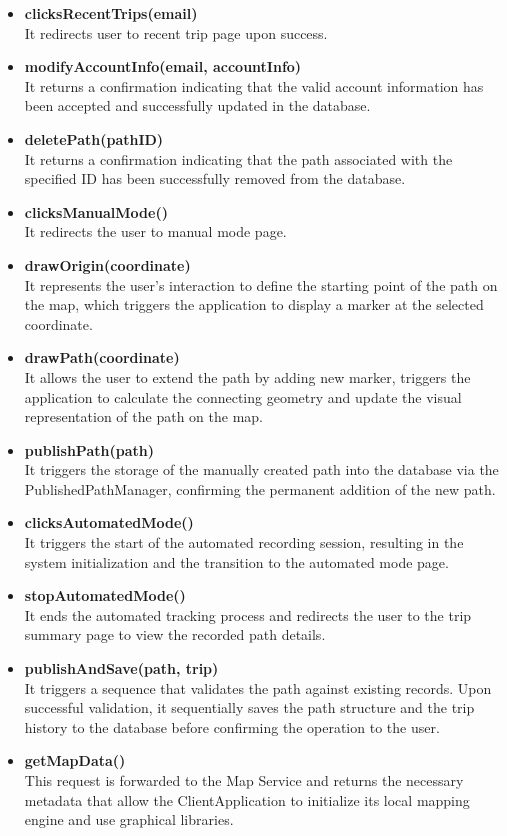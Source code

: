 \begin{itemize}
    It initiates the final save operation for the completed trip and its associated report, ultimately redirecting the user to the home page.
    \item \textbf{clicksRecentTrips(email)}\\
    It redirects user to recent trip page upon success.
    \item \textbf{modifyAccountInfo(email, accountInfo)}\\
    It returns a confirmation indicating that the valid account information has been accepted and successfully updated in the database.
    \item \textbf{deletePath(pathID)}\\
    It returns a confirmation indicating that the path associated with the specified ID has been successfully removed from the database.
    \item \textbf{clicksManualMode()}\\
    It redirects the user to manual mode page.
    \item \textbf{drawOrigin(coordinate)}\\
    It represents the user's interaction to define the starting point of the path on the map, which triggers the application to display a marker at the selected coordinate.
    \item \textbf{drawPath(coordinate)}\\
    It allows the user to extend the path by adding new marker, triggers the application to calculate the connecting geometry and update the visual representation of the path on the map.
    \item \textbf{publishPath(path)}\\
    It triggers the storage of the manually created path into the database via the PublishedPathManager, confirming the permanent addition of the new path.
    \item \textbf{clicksAutomatedMode()}\\
    It triggers the start of the automated recording session, resulting in the system initialization and the transition to the automated mode page.
    \item \textbf{stopAutomatedMode()}\\
    It ends the automated tracking process and redirects the user to the trip summary page to view the recorded path details.
    \item \textbf{publishAndSave(path, trip)}\\
    It triggers a sequence that validates the path against existing records. Upon successful validation, it sequentially saves the path structure and the trip history to the database before confirming the operation to the user.
    \item \textbf{getMapData()}\\
    This request is forwarded to the Map Service and returns the necessary metadata that allow the ClientApplication to initialize its local mapping engine and use graphical libraries.
    
\end{itemize}

